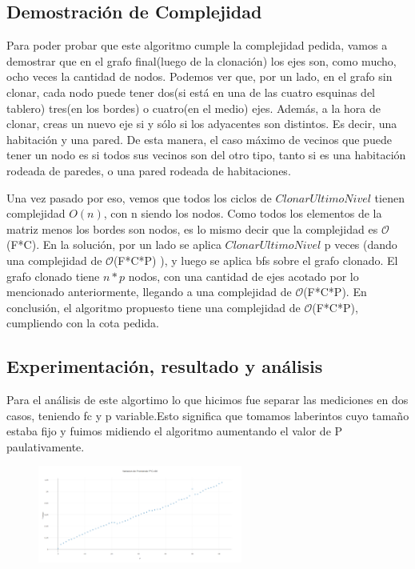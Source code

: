 \documentclass[spanish,12pt]{article}
\begin{document}
\subsection{Demostración de Complejidad}
Para poder probar que este algoritmo cumple la complejidad pedida, vamos a demostrar que en el grafo final(luego de la clonación) los ejes son, como mucho, ocho veces la cantidad de nodos.
Podemos ver que, por un lado, en el grafo sin clonar, cada nodo puede tener dos(si está en una de las cuatro esquinas del tablero) tres(en los bordes) o cuatro(en el medio) ejes. Además, a la hora de clonar, creas un nuevo eje si y sólo si los adyacentes son distintos. Es decir, una habitación y una pared. De esta manera, el caso máximo de vecinos que puede tener un nodo es si todos sus vecinos son del otro tipo, tanto si es una habitación rodeada de paredes, o una pared rodeada de habitaciones.

Una vez pasado por eso, vemos que todos los ciclos de $ClonarUltimoNivel$ tienen complejidad $O(n)$, con n siendo los nodos. Como todos los elementos de la matriz menos los bordes son nodos, es lo mismo decir que la complejidad es $\mathcal{O}$(F*C). En la solución, por un lado se aplica $ClonarUltimoNivel$ p veces (dando una complejidad de $\mathcal{O}$(F*C*P) ), y luego se aplica bfs sobre el grafo clonado. El grafo clonado tiene $n*p$ nodos, con una cantidad de ejes acotado por lo mencionado anteriormente, 	llegando a una complejidad de $\mathcal{O}$(F*C*P). En conclusión, el algoritmo propuesto tiene una complejidad de $\mathcal{O}$(F*C*P), cumpliendo con la cota pedida.
\subsection{Experimentación, resultado y análisis }
Para el análisis de este algortimo lo que hicimos fue separar las mediciones en dos casos, teniendo fc y p variable.Esto significa que tomamos laberintos cuyo tamaño estaba fijo y fuimos midiendo el algoritmo
aumentando el valor de P paulativamente.



\begin{figure}[H]
\centering
\includegraphics     [width=0.6\textwidth]{fcfijo}
\caption{}
\end{figure}
\end{document}

